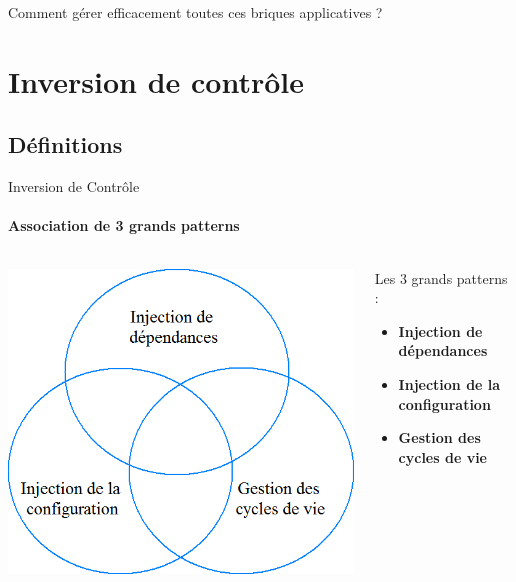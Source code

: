 \documentclass[compress]{beamer}%
\begin{document}
\begin{frame}	
	\begin{center}	
	\Large
	Comment gérer efficacement toutes ces briques applicatives ?
	\end{center}
\end{frame}
	

\section{Inversion de contrôle}

\subsection{Définitions}

\begin{frame}{Inversion de Contrôle}
	\framesubtitle{Association de 3 grands patterns}
	
	\begin{columns}
		\begin{column}{0.5\textwidth}
			\includegraphics[width=\textwidth]{images/spring_ioc.png}
		\end{column}
		\begin{column}{0.5\textwidth}
			Les 3 grands patterns :
			\begin{itemize}
			\item \textbf{Injection de dépendances}	
			\item \textbf{Injection de la configuration}
			\item \textbf{Gestion des cycles de vie}
			\end{itemize}
		\end{column}
	\end{columns}

\end{frame}
\end{document}
